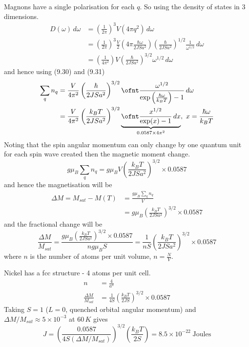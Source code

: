 \documentclass[a4paper, 11pt, normalem]{report}
\begin{document}
\chapter{}
Magnons have a single polarisation for each $q$.
So using the density of states in 3 dimensions.
\begin{align}
    D(\omega)\,d\omega &= \left(\frac{1}{2\pi}\right)^3 V(4\pi q^2)\,d\omega \\
                       &= \left(\frac{1}{2\pi}\right)^3 \frac{V}{2} \left(4\pi \frac{\hbar\omega}{2JSa^2}\right)\left(\frac{\hbar}{2JSa^2}\right)^{1/2}\frac{1}{\omega^{1/2}}\,d\omega \\
                       &= \left(\frac{1}{4\pi^2}\right)V\left(\frac{\hbar}{2JSa^2}\right)^{3/2}\omega^{1/2}\,d\omega
\end{align}
and hence using (9.30) and (9.31)
\begin{align}
    \sum_q n_q &= \frac{V}{4\pi^2}\left(\frac{\hbar}{2JSa^2}\right)^{3/2} \ofnt \frac{\omega^{1/2}}{\exp\left(\frac{\hbar\omega}{k_BT}\right)-1}\,d\omega \\
               &= \frac{V}{4\pi^2}\left(\frac{k_BT}{2JSa^2}\right)^{3/2} \underbrace{\ofnt \frac{x^{1/2}}{\exp(x) - 1}\,dx}_{0.0587\times4\pi^2},~ x = \frac{\hbar\omega}{k_BT}
\end{align}
Noting that the spin angular momentum can only change by one quantum unit for each spin wave created then the magnetic moment change.
\begin{equation}
    g\mu_B\sum_qn_q = g\mu_BV\left(\frac{k_BT}{2JSa^2}\right)^{3/2}\times0.0587
\end{equation}
and hence the magnetisation will be
\begin{align}
    \Delta M = M_{sat} - M(T) &= \frac{g\mu_B\sum_qn_q}{V} \\
                              &= g\mu_B\left(\frac{k_BT}{2JSa^2}\right)^{3/2}\times0.0587
\end{align}
and the fractional change will be
\begin{equation}
    \frac{\Delta M}{M_{sat}} = \frac{g\mu_B\left(\frac{k_BT}{2JSa^2}\right)^{3/2}\times0.0587}{ng\mu_BS} = \frac{1}{nS}\left(\frac{k_BT}{2JSa^2}\right)^{3/2}\times0.0587 
\end{equation}
where $n$ is the number of atoms per unit volume, $n=\frac{N}{V}$.
\begin{example}[Nickel]
    Nickel has a fcc structure - 4 atoms per unit cell. 
    \begin{align}
        n &= \frac{4}{a^3} \\
        \frac{\Delta M}{M_{sat}} &= \frac{1}{4S}\left(\frac{k_BT}{2JS}\right)^{3/2}\times0.0587 
    \end{align}
    Taking $S=1$ ($L=0$, quenched orbital angular momentum) and $\Delta M/M_{sat} \approx 5\times10^{-3}$ at $60\,K$ gives
    \begin{equation}
        J = \left(\frac{0.0587}{4S(\Delta M/M_{sat})}\right)^{3/2} \left(\frac{k_BT}{2S}\right) = 8.5\times10^{-22}\;\text{Joules}
    \end{equation}
\end{example}
\end{document}
